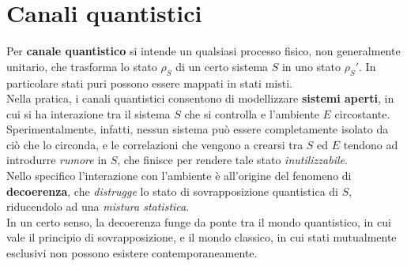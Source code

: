 \documentclass[../../InformazioneQuantistica.tex]{subfiles}
\begin{document}
\section{Canali quantistici}
Per \textbf{canale quantistico} si intende un qualsiasi processo fisico, non generalmente unitario, che trasforma lo stato $\rho_S$ di un certo sistema $S$ in uno stato $\rho_S'$. In particolare stati puri possono essere mappati in stati misti.\\

Nella pratica, i canali quantistici consentono di modellizzare \textbf{sistemi aperti}, in cui si ha interazione tra il sistema $S$ che si controlla e l'ambiente $E$ circostante. Sperimentalmente, infatti, nessun sistema può essere completamente isolato da ciò che lo circonda, e le correlazioni che vengono a crearsi tra $S$ ed $E$ tendono ad introdurre \textit{rumore} in $S$, che finisce per rendere tale stato \textit{inutilizzabile}.\\
Nello specifico l'interazione con l'ambiente è all'origine del fenomeno di \textbf{decoerenza}, che \textit{distrugge} lo stato di sovrapposizione quantistica di $S$, riducendolo ad una \textit{mistura statistica}.\\
In un certo senso, la decoerenza funge da ponte tra il mondo quantistico, in cui vale il principio di sovrapposizione, e il mondo classico, in cui stati mutualmente esclusivi non possono esistere contemporaneamente.
\end{document}
